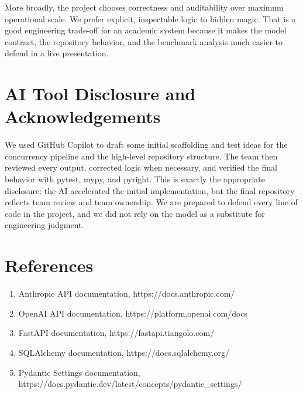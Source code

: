 \documentclass[11pt,a4paper]{article}
\begin{document}
More broadly, the project chooses correctness and auditability over maximum operational scale. We prefer explicit, inspectable logic to hidden magic. That is a good engineering trade-off for an academic system because it makes the model contract, the repository behavior, and the benchmark analysis much easier to defend in a live presentation.

\section{AI Tool Disclosure and Acknowledgements}
We used GitHub Copilot to draft some initial scaffolding and test ideas for the concurrency pipeline and the high-level repository structure. The team then reviewed every output, corrected logic when necessary, and verified the final behavior with pytest, mypy, and pyright. This is exactly the appropriate disclosure: the AI accelerated the initial implementation, but the final repository reflects team review and team ownership. We are prepared to defend every line of code in the project, and we did not rely on the model as a substitute for engineering judgment.

\section*{References}
\begin{enumerate}[leftmargin=2.4em]
\item Anthropic API documentation, https://docs.anthropic.com/
\item OpenAI API documentation, https://platform.openai.com/docs
\item FastAPI documentation, https://fastapi.tiangolo.com/
\item SQLAlchemy documentation, https://docs.sqlalchemy.org/
\item Pydantic Settings documentation, https://docs.pydantic.dev/latest/concepts/pydantic\_settings/
\end{enumerate}
\end{document}
